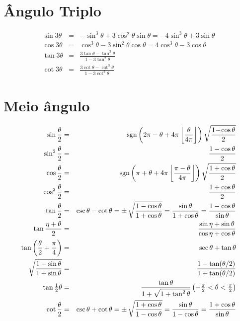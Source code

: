 \documentclass[
	article,			%
	12pt,				%
	twoside,			%
	a4paper,			%
	english,			%
	brazil,				%
	sumario=tradicional
	]{abntex2-modelo-notas-de-aula}
\newcommand{\sgn}{\mathop{\mathrm{sgn}}}
\begin{document}
\begin{apendicesenv}
\section{Ângulo Triplo}


\begin{eqnarray}
\sin 3\theta &=& - \sin^3\theta + 3 \cos^2\theta \sin\theta 
= - 4\sin^3\theta + 3\sin\theta  \\
\cos 3\theta  &=& \cos^3\theta - 3 \sin^2 \theta\cos \theta =
4 \cos^3\theta - 3 \cos\theta \\
\tan 3\theta &=& \frac{3 \tan\theta - \tan^3\theta}{1 - 3 \tan^2\theta}\\
\cot 3\theta &=& \frac{3 \cot\theta - \cot^3\theta}{1 - 3 \cot^2\theta}
\end{eqnarray}


\section{Meio ângulo}

\begin{eqnarray}
\sin \frac{\theta}{2} &=& \sgn \left(2 \pi - \theta + 4 \pi \left\lfloor \frac{\theta}{4\pi} \right\rfloor \right) \sqrt{\frac{1 \! - \! \cos \theta}{2}}\\
\sin^2\frac{\theta}{2} &=& \frac{1-\cos\theta}{2}\\
\cos \frac{\theta}{2} &=& \sgn \left(\pi + \theta + 4 \pi \left\lfloor \frac{\pi - \theta}{4\pi} \right\rfloor \right) \sqrt{\frac{1 + \cos\theta}{2}}\\
\cos^2\frac{\theta}{2} &=&\frac{1+\cos\theta}{2}\\
\tan \frac{\theta}{2} &=& \csc \theta - \cot \theta = \pm\, \sqrt{1 - \cos \theta \over 1 + \cos \theta} = \frac{\sin \theta}{1 + \cos \theta} = \frac{1-\cos \theta}{\sin \theta} \\
\tan\frac{\eta+\theta}{2} &=& \frac{\sin\eta+\sin\theta}{\cos\eta+\cos\theta} \\
\tan\left(\frac{\theta}{2} + \frac{\pi}{4}\right) &= &\sec\theta + \tan\theta \\
\sqrt{\frac{1 - \sin\theta}{1 + \sin\theta}}  &= &\frac{1 - \tan(\theta/2)}{1 + \tan(\theta/2)}\\
\tan\tfrac{1}{2}\theta  &=& \frac{\tan\theta}{1 + \sqrt{1+\tan^2\theta}} \left(-\tfrac{\pi}{2} < \theta < \tfrac{\pi}{2} \right)\\
\cot \frac{\theta}{2} & =& \csc \theta + \cot \theta = \pm\, \sqrt{1 + \cos \theta \over 1 - \cos \theta} = \frac{\sin \theta}{1 - \cos \theta} = \frac{1 + \cos \theta}{\sin \theta} 
\end{eqnarray}



\end{apendicesenv}
\end{document}
